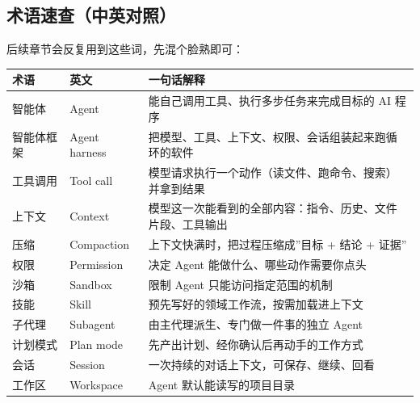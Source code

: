\subsection{术语速查（中英对照）}\label{ux672fux8bedux901fux67e5ux4e2dux82f1ux5bf9ux7167}

后续章节会反复用到这些词，先混个脸熟即可：

{\def\LTcaptype{none} %
\begin{longtable}[]{@{}
  >{\raggedright\arraybackslash}p{}
  >{\raggedright\arraybackslash}p{}
  >{\raggedright\arraybackslash}p{}@{}}
\toprule\noalign{}
\begin{minipage}[b]{\linewidth}\raggedright
术语
\end{minipage} & \begin{minipage}[b]{\linewidth}\raggedright
英文
\end{minipage} & \begin{minipage}[b]{\linewidth}\raggedright
一句话解释
\end{minipage} \\
\midrule\noalign{}
\endhead
\bottomrule\noalign{}
\endlastfoot
智能体 & Agent & 能自己调用工具、执行多步任务来完成目标的 AI 程序 \\
智能体框架 & Agent harness &
把模型、工具、上下文、权限、会话组装起来跑循环的软件 \\
工具调用 & Tool call &
模型请求执行一个动作（读文件、跑命令、搜索）并拿到结果 \\
上下文 & Context &
模型这一次能看到的全部内容：指令、历史、文件片段、工具输出 \\
压缩 & Compaction & 上下文快满时，把过程压缩成''目标 + 结论 + 证据'' \\
权限 & Permission & 决定 Agent 能做什么、哪些动作需要你点头 \\
沙箱 & Sandbox & 限制 Agent 只能访问指定范围的机制 \\
技能 & Skill & 预先写好的领域工作流，按需加载进上下文 \\
子代理 & Subagent & 由主代理派生、专门做一件事的独立 Agent \\
计划模式 & Plan mode & 先产出计划、经你确认后再动手的工作方式 \\
会话 & Session & 一次持续的对话上下文，可保存、继续、回看 \\
工作区 & Workspace & Agent 默认能读写的项目目录 \\
\end{longtable}
}

